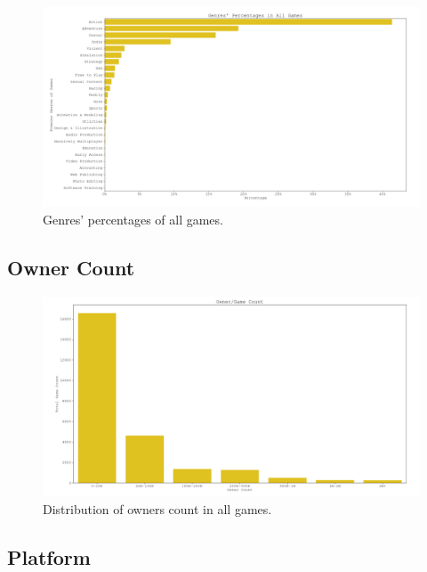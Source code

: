 \documentclass[conference]{IEEEtran}
\begin{document}
\begin{figure}[h]
  \includegraphics[width=\linewidth]{assets/genres_dist.png}
  \caption{Genres' percentages of all games.}
  \label{fig:genre1}
\end{figure}


\subsection{Owner Count}


\begin{figure}[h]
  \includegraphics[width=\linewidth]{assets/owners_count.png}
  \caption{Distribution of owners count in all games.}
  \label{fig:ownercount1}
\end{figure}


\subsection{Platform}
\end{document}
